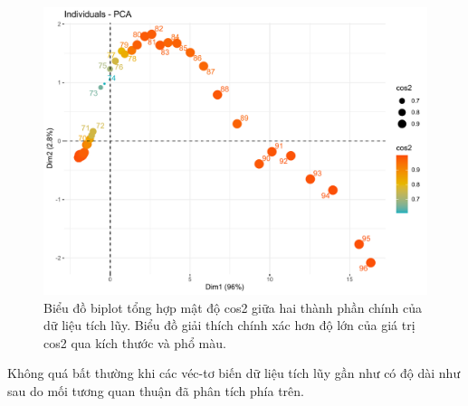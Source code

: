 \documentclass[../thesis.tex]{subfiles}
\begin{document}
\begin{figure}[H]
	\centering
	\includegraphics[width=0.75\linewidth]{images/ind_cul}
	\caption[Biểu đồ biplot tổng hợp mật độ cos2 giữa hai thành phần chính của dữ liệu tích lũy]{Biểu đồ biplot tổng hợp mật độ cos2 giữa hai thành phần chính của dữ liệu tích lũy. Biểu đồ giải thích chính xác hơn độ lớn của giá trị cos2 qua kích thước và phổ màu.}
	\label{fig:indcul}
\end{figure}

Không quá bất thường khi các véc-tơ biến dữ liệu tích lũy gần như có độ dài như sau do mối tương quan thuận đã phân tích phía trên.
\end{document}
